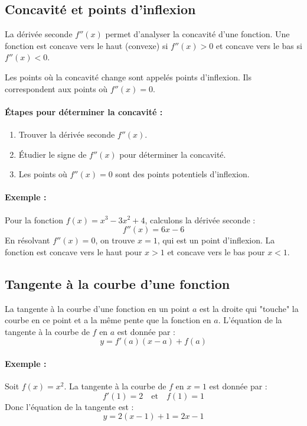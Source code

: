 \documentclass{article}
\begin{document}
	\subsection{Concavité et points d'inflexion}
	
	La dérivée seconde \( f''(x) \) permet d'analyser la concavité d'une fonction. Une fonction est concave vers le haut (convexe) si \( f''(x) > 0 \) et concave vers le bas si \( f''(x) < 0 \).
	
	Les points où la concavité change sont appelés points d'inflexion. Ils correspondent aux points où \( f''(x) = 0 \).
	
	\paragraph{Étapes pour déterminer la concavité :}
	\begin{enumerate}
		\item Trouver la dérivée seconde \( f''(x) \).
		\item Étudier le signe de \( f''(x) \) pour déterminer la concavité.
		\item Les points où \( f''(x) = 0 \) sont des points potentiels d'inflexion.
	\end{enumerate}
	
	\paragraph{Exemple :} Pour la fonction \( f(x) = x^3 - 3x^2 + 4 \), calculons la dérivée seconde :
	\[
	f''(x) = 6x - 6
	\]
	En résolvant \( f''(x) = 0 \), on trouve \( x = 1 \), qui est un point d'inflexion. La fonction est concave vers le haut pour \( x > 1 \) et concave vers le bas pour \( x < 1 \).
	
	\subsection{Tangente à la courbe d'une fonction}
	
	La tangente à la courbe d'une fonction en un point \( a \) est la droite qui "touche" la courbe en ce point et a la même pente que la fonction en \( a \). L'équation de la tangente à la courbe de \( f \) en \( a \) est donnée par :
	\[
	y = f'(a)(x - a) + f(a)
	\]
	
	\paragraph{Exemple :} Soit \( f(x) = x^2 \). La tangente à la courbe de \( f \) en \( x = 1 \) est donnée par :
	\[
	f'(1) = 2 \quad \text{et} \quad f(1) = 1
	\]
	Donc l'équation de la tangente est :
	\[
	y = 2(x - 1) + 1 = 2x - 1
	\]
	
\end{document}

